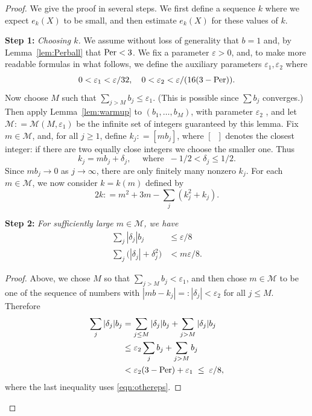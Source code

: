 \documentclass[11pt, reqno]{amsart}
\theoremstyle{remark}
\numberwithin{equation}{subsection}
\numberwithin{figure}{section}
\theoremstyle{customremark}
\newcommand{\Per}{{\rm Per}}
\newcommand{\NI}{{\noindent}}
\newcommand{\Mm}{{\mathcal M}}
\newcommand{\de}{{\delta}}
\newcommand{\MS}{{\medskip}}
\newcommand{\eps}{\varepsilon}
\begin{document}
\begin{proof}
We give the proof in several steps. We first define a sequence $k$ where we expect $e_k(X) $ to be small, and then estimate $e_k(X) $
for these values of $k$.  \MS

\NI
{\bf Step 1:} {\it Choosing  $k$.} 
We assume without loss of generality that $b = 1$ and, by Lemma~\ref{lem:Perball} that $\Per < 3$. We fix  a parameter $\eps> 0$, and, to make more readable formulas in what follows, 
we define the auxiliary parameters $\eps_1, \eps_2$ where
\begin{equation}
\label{eqn:othereps}
0<\eps_1 < \eps/32, \quad 0<\eps_2 < \eps/(16 (3-\Per)).
\end{equation}
 Now choose $M$ such that $\sum_{j > M} b_j \le \eps_1.$  (This is possible since $\sum b_j$ converges.)
 Then apply Lemma~\ref{lem:warmup}  to $(b_1,\ldots,b_M)$, with parameter $\eps_2$ , and let $\Mm: = \Mm(M,\eps_1)$ be the infinite set of integers  guaranteed by this lemma.  Fix $m\in \Mm$, and, for
all $j\ge 1$, define $k_j: = [ m b_j]$, where $[\;\; ]$ denotes the closest integer:
 if there are two equally close integers we choose the smaller one.  
 Thus
 $$k_j = m b_j + \delta_j, \quad \mbox{ where } \ -1/2 < \delta_j \le 1/2.
 $$
Since $m b_j\to 0$ as $j\to \infty$, there are only finitely many  nonzero $k_j.$  
 For each $m\in \Mm$, we now consider $k = k(m)$ defined by 
\begin{equation}
\label{eqn:defnk}
2k: = m^2 + 3m - \sum_j  (k_j^2 + k_j).
\end{equation}



\NI
{\bf Step 2:} {\it For sufficiently large $m\in \Mm$, we have}
\begin{align} \label{eqn:easy} \sum_j |\delta_j| b_j&\le \eps/8
\\  \label{eqn:slightlydelicate} 
\sum_j\bigl( |\delta_j| + \delta_j^2\bigr) &< m \eps/8.
\end{align}

\begin{proof} Above, we chose $M$ so that $\sum_{j>M} b_j < \eps_1$, and then chose $m\in \Mm$ to be one of the sequence of numbers
with  $|mb - k_j| =:|\de_j|< \eps_2$ for all $j\le M$.
Therefore 
\begin{align*}
\sum_j |\delta_j| b_j & = \sum_{j\le M} |\delta_j| b_j + \sum_{j> M} |\delta_j| b_j \\
& \le \eps_2 \sum_j b_j + \sum_{j>M} b_j \\
& < \eps_2 (3-\Per) + \eps_1\;  \le \; \eps/8,
\end{align*}
where the last inequality uses \eqref{eqn:othereps}.


\end{proof}
\end{proof}
\end{document}
